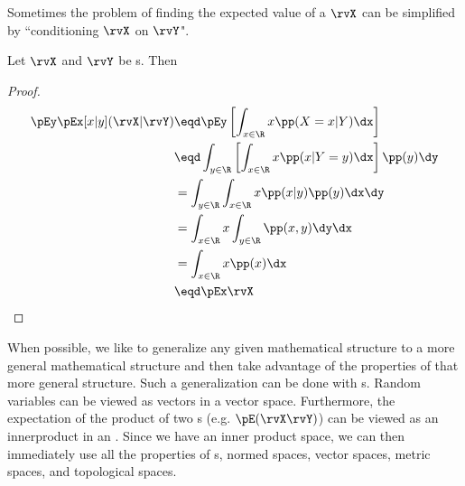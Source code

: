 Sometimes the problem of finding the expected value of a  $\rvX$
can be simplified by ``conditioning $\rvX$ on $\rvY$".
\begin{theorem}
Let $\rvX$ and $\rvY$ be s. Then
\end{theorem}
\begin{proof}
\begin{align*}
   \pEy\pEx[x|y](\rvX|\rvY)
     &\eqd \pEy \left[ \int_{x\in\R}x \pp(X=x|Y) \dx \right]
   \\&\eqd \int_{y\in\R} \left[\int_{x\in\R}x \pp(x|Y=y) \dx \right] \pp(y) \dy
   \\&=    \int_{y\in\R} \int_{x\in\R}x \pp(x|y)\pp(y) \dx   \dy
   \\&=    \int_{x\in\R}x \int_{y\in\R} \pp(x,y) \dy   \dx
   \\&=    \int_{x\in\R}x \pp(x) \dx
   \\&\eqd \pEx\rvX
\end{align*}
\end{proof}

When possible, we like to generalize any given mathematical structure
to a more general mathematical structure and then take advantage of
the properties of that more general structure.
Such a generalization can be done with s.
Random variables can be viewed as vectors in a vector space.
Furthermore, the expectation of the product of two s
(e.g. $\pE(\rvX\rvY)$)
can be viewed as an innerproduct in an .
Since we have an inner product space,
we can then immediately use all the properties of
s, normed spaces, vector spaces, metric spaces,
and topological spaces.

